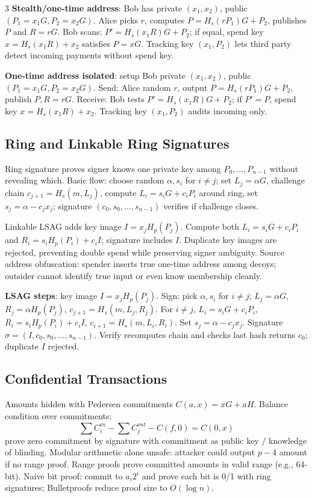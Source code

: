 \documentclass[8pt]{extarticle}
\newcommand{\term}[1]{\textbf{#1}}
\newcommand{\tightbox}[1]{\colorbox{boxc}{\parbox{0.985\linewidth}{#1}}}
\begin{document}
\begin{multicols*}{3}
\term{Stealth/one-time address}: Bob has private $(x_1,x_2)$, public $(P_1=x_1G,P_2=x_2G)$. Alice picks $r$, computes $P=H_s(rP_1)G+P_2$, publishes $P$ and $R=rG$. Bob scans: $P'=H_s(x_1R)G+P_2$; if equal, spend key $x=H_s(x_1R)+x_2$ satisfies $P=xG$. Tracking key $(x_1,P_2)$ lets third party detect incoming payments without spend key.

\tightbox{\term{One-time address isolated}: setup Bob private $(x_1,x_2)$, public $(P_1=x_1G,P_2=x_2G)$. Send: Alice random $r$, output $P=H_s(rP_1)G+P_2$, publish $P,R=rG$. Receive: Bob tests $P'=H_s(x_1R)G+P_2$; if $P'=P$, spend key $x=H_s(x_1R)+x_2$. Tracking key $(x_1,P_2)$ audits incoming only.}

\subsection{Ring and Linkable Ring Signatures}
Ring signature proves signer knows one private key among $P_0,\dots,P_{n-1}$ without revealing which. Basic flow: choose random $\alpha,s_i$ for $i\ne j$; set $L_j=\alpha G$, challenge chain $c_{j+1}=H_s(m,L_j)$, compute $L_i=s_iG+c_iP_i$ around ring, set $s_j=\alpha-c_jx_j$; signature $(c_0,s_0,\dots,s_{n-1})$ verifies if challenge closes.

Linkable LSAG adds key image $I=x_jH_p(P_j)$. Compute both $L_i=s_iG+c_iP_i$ and $R_i=s_iH_p(P_i)+c_iI$; signature includes $I$. Duplicate key images are rejected, preventing double spend while preserving signer ambiguity. Source address obfuscation: spender inserts true one-time address among decoys; outsider cannot identify true input or even know membership cleanly.

\term{LSAG steps}: key image $I=x_jH_p(P_j)$. Sign: pick $\alpha,s_i$ for $i\ne j$; $L_j=\alpha G$, $R_j=\alpha H_p(P_j)$, $c_{j+1}=H_s(m,L_j,R_j)$. For $i\ne j$, $L_i=s_iG+c_iP_i$, $R_i=s_iH_p(P_i)+c_iI$, $c_{i+1}=H_s(m,L_i,R_i)$. Set $s_j=\alpha-c_jx_j$. Signature $\sigma=(I,c_0,s_0,\ldots,s_{n-1})$. Verify recomputes chain and checks last hash returns $c_0$; duplicate $I$ rejected.

\subsection{Confidential Transactions}
Amounts hidden with Pedersen commitments $C(a,x)=xG+aH$. Balance condition over commitments:
\[
\sum C_i^{in}-\sum C_j^{out}-C(f,0)=C(0,x)
\]
prove zero commitment by signature with commitment as public key / knowledge of blinding. Modular arithmetic alone unsafe: attacker could output $p-4$ amount if no range proof. Range proofs prove committed amounts in valid range (e.g., 64-bit). Naive bit proof: commit to $a_i2^i$ and prove each bit is 0/1 with ring signatures; Bulletproofs reduce proof size to $O(\log n)$.


\end{multicols*}
\end{document}

